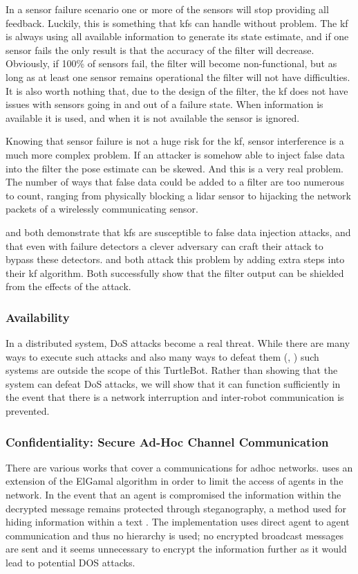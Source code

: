 \documentclass[conference]{IEEEtran}
\begin{document}
In a sensor failure scenario one or more of the sensors will stop providing all feedback. Luckily, this is something that \glspl{kf} can handle without problem. The \gls{kf} is always using all available information to generate its state estimate, and if one sensor fails the only result is that the accuracy of the filter will decrease. Obviously, if 100\% of sensors fail, the filter will become non-functional, but as long as at least one sensor remains operational the filter will not have difficulties. It is also worth nothing that, due to the design of the filter, the \gls{kf} does not have issues with sensors going in and out of a failure state. When information is available it is used, and when it is not available the sensor is ignored.

Knowing that sensor failure is not a huge risk for the \gls{kf}, sensor interference is a much more complex problem. If an attacker is somehow able to inject false data into the filter the pose estimate can be skewed. And this is a very real problem. The number of ways that false data could be added to a filter are too numerous to count, ranging from physically blocking a lidar sensor to hijacking the network packets of a wirelessly communicating sensor.

\cite{Mo2010} and \cite{Yang2013} both demonstrate that \glspl{kf} are susceptible to false data injection attacks, and that even with failure detectors a clever adversary can craft their attack to bypass these detectors. \cite{Bezzo_2014} and \cite{Mo2014} both attack this problem by adding extra steps into their \gls{kf} algorithm. Both successfully show that the filter output can be shielded from the effects of the attack.

\subsubsection{Availability}
In a distributed system, \gls{DoS} attacks become a real threat. While there are many ways to execute such attacks and also many ways to defeat them (\cite{wood2002denial}, \cite{bellardo2003802}) such systems are outside the scope of this TurtleBot. Rather than showing that the system can defeat \gls{DoS} attacks, we will show that it can function sufficiently in the event that there is a network interruption and inter-robot communication is prevented.

\subsubsection{Confidentiality: Secure Ad-Hoc Channel Communication}
There are various works that cover a communications for adhoc networks. \cite{vegh2014securing} uses an extension of the ElGamal algorithm in order to limit the access of agents in the network. In the event that an agent is compromised the information within the decrypted message remains protected through steganography, a method used for hiding information within a text \cite{adi2009mechatronic}. The implementation uses direct agent to agent communication and thus no hierarchy is used; no encrypted broadcast messages are sent and it seems unnecessary to encrypt the information further as it would lead to potential DOS attacks.
\end{document}
